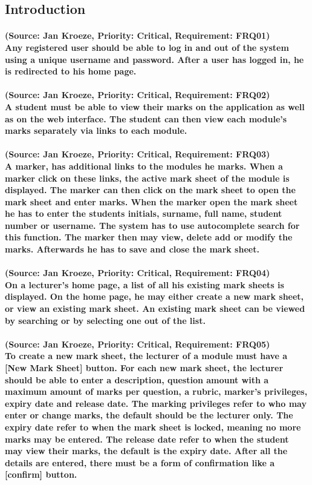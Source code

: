 \documentclass[12pt]{article}
\begin{document}
  \subsection{Introduction}
  \paragraph{(Source: Jan Kroeze, Priority: Critical, Requirement: FRQ01) \\
  Any registered user should be able to log in and out of the system using a unique username and password. After a user has logged in, he is redirected to his home page.}
  \paragraph{(Source: Jan Kroeze, Priority: Critical, Requirement: FRQ02) \\
  A student must be able to view their marks on the application as well as on  the web interface. The student can then view each module's marks separately via links to each module. }
  \paragraph{(Source: Jan Kroeze, Priority: Critical, Requirement: FRQ03) \\
  A marker, has additional links to the modules he marks. When a marker click on these links, the active mark sheet of the module is displayed. The marker can then click on the mark sheet to open the mark sheet and enter marks. When the marker open the mark sheet he has to enter the students initials, surname, full name, student number or username. The system has to use autocomplete search for this function. The marker then may view, delete add or modify the marks. Afterwards he has to save and close the mark sheet.}
  \paragraph{(Source: Jan Kroeze, Priority: Critical, Requirement: FRQ04) \\
  On a lecturer's home page, a list of all his existing mark sheets is displayed. On the home page, he may either create a new mark sheet, or view an existing mark sheet. An existing mark sheet can be viewed by searching or by selecting one out of the list.}
  \paragraph{(Source: Jan Kroeze, Priority: Critical, Requirement: FRQ05) \\
  To create a new mark sheet, the lecturer of a module must have a [New Mark Sheet] button. For each new mark sheet, the lecturer should be able to enter a description, question amount with a maximum amount of marks per question, a rubric, marker's privileges, expiry date and release date. The marking privileges refer to who may enter or change marks, the default should be the lecturer only. The expiry date refer to when the mark sheet is locked, meaning no more marks may be entered. The release date refer to when the student may view their marks, the default is the expiry date. After all the details are entered, there must be a form of confirmation like a [confirm] button.}
\end{document}
